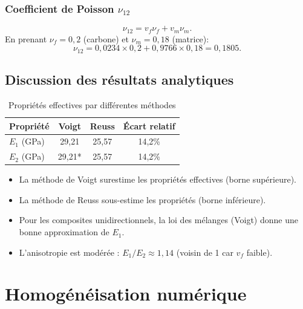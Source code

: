 \documentclass{rapportECL}
\begin{document}
\vspace{20pt}

\subsubsection{Coefficient de Poisson $\nu_{12}$}
\begin{center}
\begin{minipage}{0.9\textwidth}
\begin{framed}
\[
\nu_{12} = v_f \nu_f + v_m \nu_m.
\]
En prenant $\nu_f = 0,2$ (carbone) et $\nu_m = 0,18$ (matrice):
\[
\nu_{12} = 0,0234 \times 0,2 + 0,9766 \times 0,18 = 0,1805.
\]
\end{framed}
\end{minipage}
\end{center}

\vspace{20pt}

\subsection{Discussion des résultats analytiques}
\begin{table}[H]
\centering
\caption{Propriétés effectives par différentes méthodes}
\begin{tabular}{lccc}
\toprule
Propriété & Voigt & Reuss & Écart relatif \\
\midrule
$E_1$ (GPa) & 29,21 & 25,57 & 14,2\% \\
$E_2$ (GPa) & 29,21* & 25,57 & 14,2\% \\
\bottomrule
\end{tabular}
\end{table}

\begin{itemize}
\item La méthode de Voigt surestime les propriétés effectives (borne supérieure).
\item La méthode de Reuss sous-estime les propriétés (borne inférieure).
\item Pour les composites unidirectionnels, la loi des mélanges (Voigt) donne une bonne approximation de $E_1$.
\item L'anisotropie est modérée : $E_1/E_2 \approx 1,14$ (voisin de 1 car $v_f$ faible).
\end{itemize}

\newpage

\section{Homogénéisation numérique}
\vspace{20pt}
\end{document}
